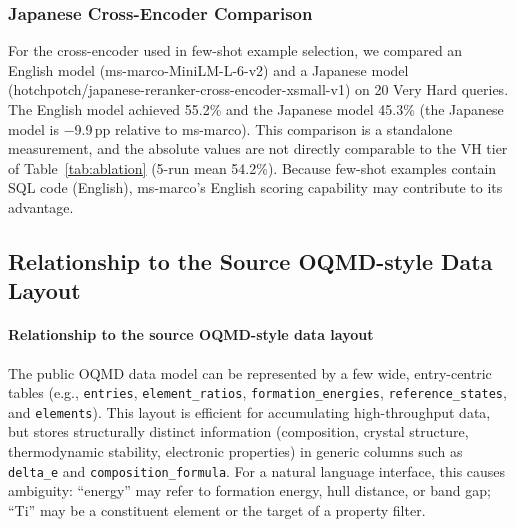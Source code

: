 \subsubsection{Japanese Cross-Encoder Comparison}

For the cross-encoder used in few-shot example selection, we compared an English model (ms-marco-MiniLM-L-6-v2) and a Japanese model (hotchpotch/japanese-reranker-cross-encoder-xsmall-v1) on 20 Very Hard queries. The English model achieved 55.2\% and the Japanese model 45.3\% (the Japanese model is $-$9.9\,pp relative to ms-marco). This comparison is a standalone measurement, and the absolute values are not directly comparable to the VH tier of Table~\ref{tab:ablation} (5-run mean 54.2\%). Because few-shot examples contain SQL code (English), ms-marco's English scoring capability may contribute to its advantage.


\subsection{Relationship to the Source OQMD-style Data Layout}

\paragraph*{Relationship to the source OQMD-style data layout}

The public OQMD data model can be represented by a few wide, entry-centric tables (e.g., \texttt{entries}, \texttt{element\_ratios}, \texttt{formation\_energies}, \texttt{reference\_states}, and \texttt{elements}). This layout is efficient for accumulating high-throughput data, but stores structurally distinct information (composition, crystal structure, thermodynamic stability, electronic properties) in generic columns such as \texttt{delta\_e} and \texttt{composition\_formula}. For a natural language interface, this causes ambiguity: ``energy'' may refer to formation energy, hull distance, or band gap; ``Ti'' may be a constituent element or the target of a property filter.

